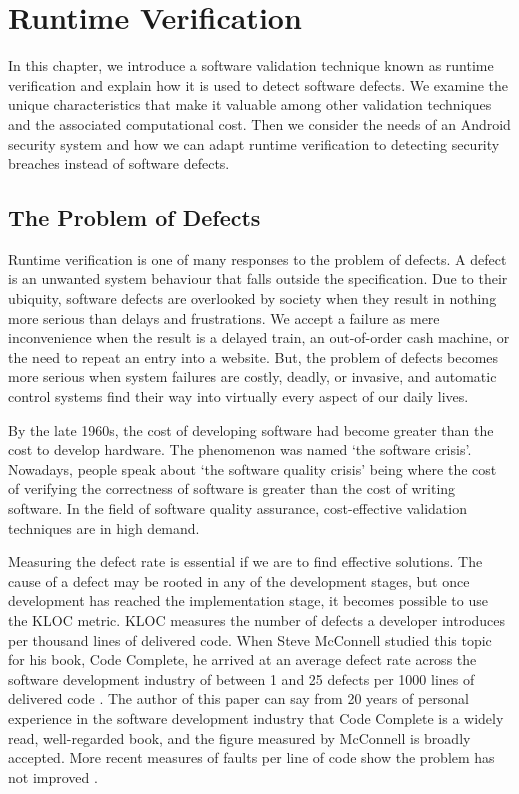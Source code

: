 \chapter{Runtime Verification}
\label{chap:Runtime Verification}

In this chapter, we introduce a software validation technique known as runtime verification and explain how it is used to detect software defects.  We examine the unique characteristics that make it valuable among other validation techniques and the associated computational cost.  Then we consider the needs of an Android security system and how we can adapt runtime verification to detecting security breaches instead of software defects.

\section{The Problem of Defects}

Runtime verification is one of many responses to the problem of defects.  A defect is an unwanted system behaviour that falls outside the specification.  Due to their ubiquity, software defects are overlooked by society when they result in nothing more serious than delays and frustrations.  We accept a failure as mere inconvenience when the result is a delayed train, an out-of-order cash machine, or the need to repeat an entry into a website.  But, the problem of defects becomes more serious when system failures are costly, deadly, or invasive, and automatic control systems find their way into virtually every aspect of our daily lives.

By the late 1960s, the cost of developing software had become greater than the cost to develop hardware.  The phenomenon was named `the software crisis'.  Nowadays, people speak about `the software quality crisis' being where the cost of verifying the correctness of software is greater than the cost of writing software.  In the field of software quality assurance, cost-effective validation techniques are in high demand.

Measuring the defect rate is essential if we are to find effective solutions.  The cause of a defect may be rooted in any of the development stages, but once development has reached the implementation stage, it becomes possible to use the KLOC metric.  KLOC measures the number of defects a developer introduces per thousand lines of delivered code.  When Steve McConnell studied this topic for his book, Code Complete, he arrived at an average defect rate across the software development industry of between 1 and 25 defects per 1000 lines of delivered code \cite{CodeCompleteKLOC}.  The author of this paper can say from 20 years of personal experience in the software development industry that Code Complete is a widely read, well-regarded book, and the figure measured by McConnell is broadly accepted.  More recent measures of faults per line of code show the problem has not improved \cite{BattleOfTheBugs} \cite{Coralogix} \cite{sogetilabs}.


